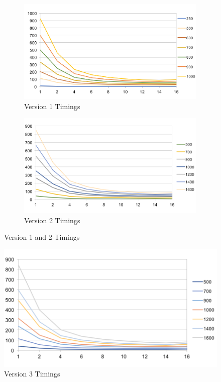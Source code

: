 \documentclass{report}
\begin{document}
\begin{figure}[h]
\begin{subfigure}{0.5\textwidth}
\includegraphics[width=1\linewidth, height=5cm]{V1-Timings} 
\caption{Version 1 Timings}
\label{fig:subim1}
\end{subfigure}
\begin{subfigure}{0.5\textwidth}
\includegraphics[width=1\linewidth, height=5cm]{V2-Timings} 
\caption{Version 2 Timings}
\label{fig:subim2}
\end{subfigure}
\caption{Version 1 and 2 Timings}
\end{figure}

\begin{figure}[h]
\includegraphics[width=1\textwidth]{V3-Timings}
\caption{Version 3 Timings}
\label{fig:subim3}
\end{figure}
\pagebreak
\end{document}

